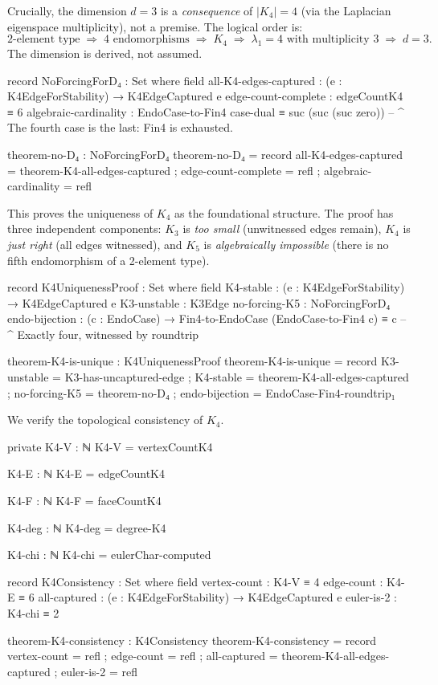 \documentclass[11pt,a4paper]{book}
\begin{document}
Crucially, the dimension $d = 3$ is a \emph{consequence} of $|K_4| = 4$ (via the
Laplacian eigenspace multiplicity), not a premise. The logical order is:
\[
  \text{2-element type} \;\Rightarrow\; 4\text{ endomorphisms} \;\Rightarrow\;
  K_4 \;\Rightarrow\; \lambda_1 = 4\text{ with multiplicity }3 \;\Rightarrow\; d = 3.
\]
The dimension is derived, not assumed.

\begin{code}
record NoForcingForD₄ : Set where
  field
    all-K4-edges-captured : (e : K4EdgeForStability) → K4EdgeCaptured e
    edge-count-complete : edgeCountK4 ≡ 6
    algebraic-cardinality : EndoCase-to-Fin4 case-dual ≡ suc (suc (suc zero))
    -- ^ The fourth case is the last: Fin4 is exhausted.

theorem-no-D₄ : NoForcingForD₄
theorem-no-D₄ = record
  { all-K4-edges-captured = theorem-K4-all-edges-captured
  ; edge-count-complete = refl
  ; algebraic-cardinality = refl
  }

\end{code}

This proves the uniqueness of $K_4$ as the foundational structure. The proof
has three independent components: $K_3$ is \emph{too small} (unwitnessed edges
remain), $K_4$ is \emph{just right} (all edges witnessed), and $K_5$ is
\emph{algebraically impossible} (there is no fifth endomorphism of a 2-element type).

\begin{code}
record K4UniquenessProof : Set where
  field
    K4-stable     : (e : K4EdgeForStability) → K4EdgeCaptured e
    K3-unstable   : K3Edge
    no-forcing-K5 : NoForcingForD₄
    endo-bijection : (c : EndoCase) → Fin4-to-EndoCase (EndoCase-to-Fin4 c) ≡ c
    -- ^ Exactly four, witnessed by roundtrip

theorem-K4-is-unique : K4UniquenessProof
theorem-K4-is-unique = record
  { K3-unstable = K3-has-uncaptured-edge
  ; K4-stable = theorem-K4-all-edges-captured
  ; no-forcing-K5 = theorem-no-D₄
  ; endo-bijection = EndoCase-Fin4-roundtrip₁
  }
\end{code}

We verify the topological consistency of $K_4$.

\begin{code}
private
  K4-V : ℕ
  K4-V = vertexCountK4

  K4-E : ℕ
  K4-E = edgeCountK4

  K4-F : ℕ
  K4-F = faceCountK4

  K4-deg : ℕ
  K4-deg = degree-K4

  K4-chi : ℕ
  K4-chi = eulerChar-computed

record K4Consistency : Set where
  field
    vertex-count     : K4-V ≡ 4
    edge-count       : K4-E ≡ 6
    all-captured     : (e : K4EdgeForStability) → K4EdgeCaptured e
    euler-is-2       : K4-chi ≡ 2

theorem-K4-consistency : K4Consistency
theorem-K4-consistency = record
  { vertex-count = refl
  ; edge-count   = refl
  ; all-captured = theorem-K4-all-edges-captured
  ; euler-is-2   = refl
  }
\end{code}
\end{document}
